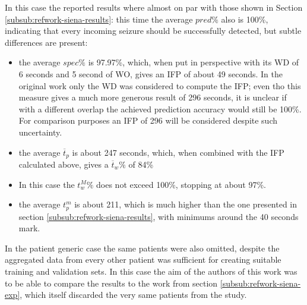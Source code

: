 In this case the reported results where almost on par with those shown in Section \ref{subsub:refwork-siena-results}: this time the average $pred\%$ also is 100\%, indicating that every incoming seizure should be successfully detected, but subtle differences are present:
\begin{itemize}
    \item the average $spec\%$ is 97.97\%, which, when put in perspective with its \gls{WD} of 6 seconds and 5 second of \gls{WO}, gives an \gls{IFP} of about 49 seconds. In the original work only the \gls{WD} was considered to compute the \gls{IFP}; even tho this measure gives a much more generous result of 296 seconds, it is unclear if with a different overlap the achieved prediction accuracy would still be 100\%.
    For comparison purposes an \gls{IFP} of 296 will be considered despite such uncertainty.
    \item the average $\overline{t}_p$ is about 247 seconds, which, when combined with the \gls{IFP} calculated above, gives a $\overline{t}_w\%$ of 84\%
    \item In this case the $t_w^M\%$ does not exceed 100\%, stopping at about 97\%.
    \item the average $t_p^m$ is about 211, which is much higher than the one presented in section \ref{subsub:refwork-siena-results}, with minimums around the 40 seconds mark.
\end{itemize}

In the patient generic case the same patients were also omitted, despite the aggregated data from every other patient was sufficient for creating suitable training and validation sets. In this case the aim of the authors of this work was to be able to compare the results to the work from section \ref{subsub:refwork-siena-exp}, which itself discarded the very same patients from the study.

